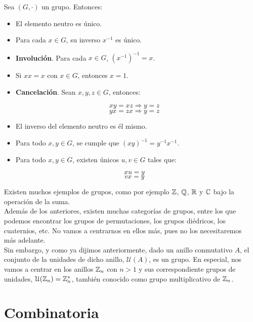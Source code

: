\begin{proposicion}
	Sea $(G, \cdot)$ un grupo. Entonces:
	
	\begin{itemize}
		\item El elemento neutro es único.
		
		\item Para cada $x \in G$, su inverso $x^{-1}$ es único.
		
		\item \textbf{Involución}. Para cada $x \in G$, $(x^{-1})^{-1} = x$.
		
		\item Si $xx = x$ con $x \in G$, entonces $x = 1$.
		
		\item \textbf{Cancelación}. Sean $x, y, z \in G$, entonces:
		
		\[ xy = xz \Rightarrow y = z \]
		\[ yx = zx \Rightarrow y = z \]
		
		\item El inverso del elemento neutro es él mismo.
		
		\item Para todo $x, y \in G$, se cumple que $(xy)^{-1} = y^{-1}x^{-1}$.
		
		\item Para todo $x, y \in G$, existen únicos $u, v \in G$ tales que:
		
		\[ xu = y \]
		\[ vx = y \]
	\end{itemize}
\end{proposicion}

Existen muchos ejemplos de grupos, como por ejemplo $\mathbb{Z}$, $\mathbb{Q}$, $\mathbb{R}$ y $\mathbb{C}$ bajo la operación de la suma.\\

Además de los anteriores, existen muchas categorías de grupos, entre los que podemos encontrar los grupos de permutaciones, los grupos diédricos, los cuaternios, etc. No vamos a centrarnos en ellos más, pues no los necesitaremos más adelante.\\

Sin embargo, y como ya dijimos anteriormente, dado un anillo conmutativo $A$, el conjunto de la unidades de dicho anillo, $\mathcal{U}(A)$, es un grupo. En especial, nos vamos a centrar en los anillos $\mathbb{Z}_n$ con $n > 1$ y sus correspondiente grupos de unidades, $\mathcal{U}(\mathbb{Z}_n) = \mathbb{Z}_n^*$, también conocido como grupo multiplicativo de $\mathbb{Z}_n$.

\section{Combinatoria}

